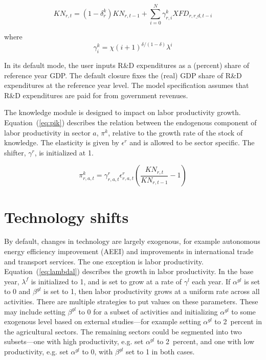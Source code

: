\documentclass[11pt,letterpaper]{report}
\begin{document}
\begin{equation}
\label{eq:kn}
\mathit{KN}_{r,t} = \left(1-\delta^k_r \right) \mathit{KN}_{r,t-1}
+ \sum_{i=0}^N{\gamma^k_{r,i} \mathit{XFD}_{r,\mathit{r\_d},t-i}}
\end{equation}

\noindent where
\[
\gamma^k_{i} = \chi \left(i + 1 \right)^{\delta/(1-\delta)}\lambda^i
\]

In its default mode, the user inputs R\&D expenditures as
a (percent) share of reference year GDP. The default closure
fixes the (real) GDP share of R\&D expenditures at the reference
year level. The model specification assumes that R\&D expenditures
are paid for from government revenues.

The knowledge module is designed to impact on labor
productivity growth. Equation~(\ref{eq:pik}) describes the relation
between the endogenous component of labor productivity
in sector $a$, $\pi^k$, relative to the growth rate of the stock
of knowledge. The elasticity is given by $\epsilon^r$ and
is allowed to be sector specific. The shifter, $\gamma^r$, is initialized
at 1.

\begin{equation}
\label{eq:pik}
\pi^k_{r,a,t} = \gamma^r_{r,a,t} \epsilon^r_{r,a,t}
\left(\frac{\mathit{KN}_{r,t}}{\mathit{KN}_{r,t-1}} - 1\right)
\end{equation}

\section{Technology shifts}

By default, changes in technology are largely exogenous, for example autonomous
energy efficiency improvement (AEEI) and improvements in international trade and
transport services. The one exception is labor productivity.
Equation~(\ref{eq:lambdal}) describes the growth in labor productivity. In the
base year, $\lambda^f$ is initialized to 1, and is set to grow at a rate of
$\gamma^l$ each year. If $\alpha^{\mathit{gl}}$ is set to 0 and
$\beta^{\mathit{gl}}$ is set to 1, then labor productivity grows at a uniform
rate across all activities. There are multiple strategies to put values on these
parameters. These may include setting $\beta^{\mathit{gl}}$ to 0 for a subset of
activities and initializing $\alpha^{\mathit{gl}}$ to some exogenous level based
on external studies---for example setting $\alpha^{\mathit{gl}}$ to 2~percent in
the agricultural sectors. The remaining sectors could be segmented into two
subsets---one with high productivity, e.g. set $\alpha^{\mathit{gl}}$ to
2~percent, and one with low productivity, e.g. set $\alpha^{\mathit{gl}}$ to 0,
with $\beta^{\mathit{gl}}$ set to 1 in both cases.
\end{document}
